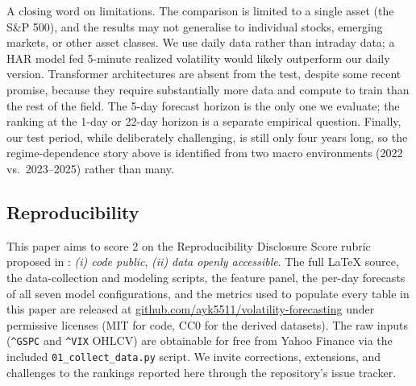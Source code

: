 A closing word on limitations. The comparison is limited to a single asset
(the S\&P 500), and the results may not generalise to individual stocks,
emerging markets, or other asset classes. We use daily data rather than
intraday data; a HAR model fed 5-minute realized volatility would likely
outperform our daily version. Transformer architectures are absent from
the test, despite some recent promise, because they require substantially
more data and compute to train than the rest of the field. The 5-day
forecast horizon is the only one we evaluate; the ranking at the 1-day or
22-day horizon is a separate empirical question. Finally, our test
period, while deliberately challenging, is still only four years long, so
the regime-dependence story above is identified from two macro
environments (2022 vs.\ 2023--2025) rather than many.

\subsection*{Reproducibility}

This paper aims to score 2 on the Reproducibility Disclosure Score rubric proposed in \citet{Khan2026}: \emph{(i) code public}, \emph{(ii) data openly accessible}. The full LaTeX source, the data-collection and modeling scripts, the feature panel, the per-day forecasts of all seven model configurations, and the metrics used to populate every table in this paper are released at \href{https://github.com/ayk5511/volatility-forecasting}{github.com/ayk5511/volatility-forecasting} under permissive licenses (MIT for code, CC0 for the derived datasets). The raw inputs (\texttt{\^{}GSPC} and \texttt{\^{}VIX} OHLCV) are obtainable for free from Yahoo Finance via the included \texttt{01\_collect\_data.py} script. We invite corrections, extensions, and challenges to the rankings reported here through the repository's issue tracker.
